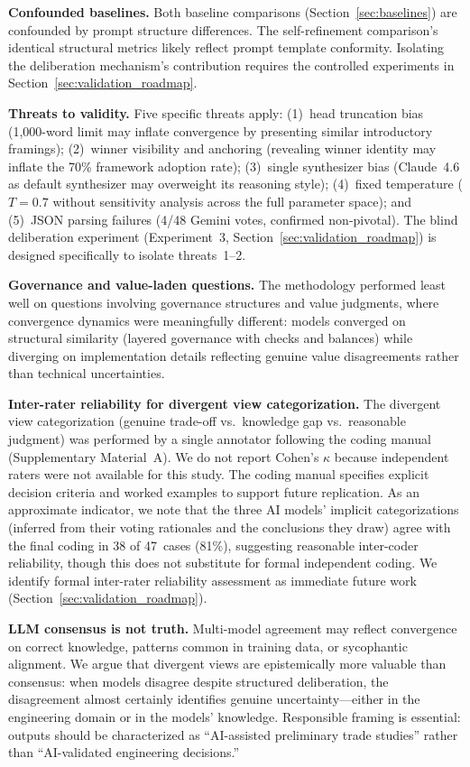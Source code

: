 \documentclass[11pt,a4paper]{article}
\begin{document}
\textbf{Confounded baselines.} Both baseline comparisons (Section~\ref{sec:baselines}) are confounded by prompt structure differences. The self-refinement comparison's identical structural metrics likely reflect prompt template conformity. Isolating the deliberation mechanism's contribution requires the controlled experiments in Section~\ref{sec:validation_roadmap}.

\textbf{Threats to validity.} Five specific threats apply: (1)~head truncation bias (1{,}000-word limit may inflate convergence by presenting similar introductory framings); (2)~winner visibility and anchoring (revealing winner identity may inflate the 70\% framework adoption rate); (3)~single synthesizer bias (Claude~4.6 as default synthesizer may overweight its reasoning style); (4)~fixed temperature ($T = 0.7$ without sensitivity analysis across the full parameter space); and (5)~JSON parsing failures (4/48 Gemini votes, confirmed non-pivotal). The blind deliberation experiment (Experiment~3, Section~\ref{sec:validation_roadmap}) is designed specifically to isolate threats~1--2.

\textbf{Governance and value-laden questions.} The methodology performed least well on questions involving governance structures and value judgments, where convergence dynamics were meaningfully different: models converged on structural similarity (layered governance with checks and balances) while diverging on implementation details reflecting genuine value disagreements rather than technical uncertainties.

\textbf{Inter-rater reliability for divergent view categorization.} The divergent view categorization (genuine trade-off vs.\ knowledge gap vs.\ reasonable judgment) was performed by a single annotator following the coding manual (Supplementary Material~A). We do not report Cohen's $\kappa$ because independent raters were not available for this study. The coding manual specifies explicit decision criteria and worked examples to support future replication. As an approximate indicator, we note that the three AI models' implicit categorizations (inferred from their voting rationales and the conclusions they draw) agree with the final coding in 38 of 47~cases (81\%), suggesting reasonable inter-coder reliability, though this does not substitute for formal independent coding. We identify formal inter-rater reliability assessment as immediate future work (Section~\ref{sec:validation_roadmap}).

\textbf{LLM consensus is not truth.} Multi-model agreement may reflect convergence on correct knowledge, patterns common in training data, or sycophantic alignment. We argue that divergent views are epistemically more valuable than consensus: when models disagree despite structured deliberation, the disagreement almost certainly identifies genuine uncertainty---either in the engineering domain or in the models' knowledge. Responsible framing is essential: outputs should be characterized as ``AI-assisted preliminary trade studies'' rather than ``AI-validated engineering decisions.''
\end{document}
